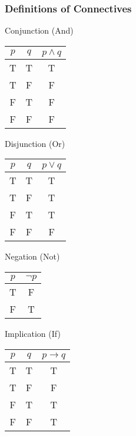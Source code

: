 \documentclass[usenames,dvipsnames]{beamer}
\begin{document}
\begin{frame}[fragile]
  \frametitle{Definitions of Connectives}
  \begin{minipage}{0.32\textwidth}
    Conjunction (And) \\
    \begin{tabular}{| c | c | c |}
    \hline
    $p$ & $q$ & $p \land q$ \\
    \hline
    T & T & T \\
    T & F & F \\
    F & T & F \\
    F & F & F \\
    \hline
    \end{tabular}
  \end{minipage}
  \begin{minipage}{0.32\textwidth}
    Disjunction (Or) \\
    \begin{tabular}{| c | c | c |}
    \hline
    $p$ & $q$ & $p \lor q$ \\
    \hline
    T & T & T \\
    T & F & T \\
    F & T & T \\
    F & F & F \\
    \hline
    \end{tabular}
  \end{minipage}
  \begin{minipage}{0.32\textwidth}
    Negation (Not) \\
    \begin{tabular}{| c | c |}
    \hline
    $p$ & $\lnot p$ \\
    \hline
    T & F \\
    F & T \\
    \hline
    \end{tabular}
  \end{minipage}
  \begin{minipage}{0.32\textwidth}
    $\;$ \\
    Implication (If) \\
    \begin{tabular}{| c | c | c |}
    \hline
    $p$ & $q$ & $p \rightarrow q$ \\
    \hline
    T & T & T \\
    T & F & F \\
    F & T & T \\
    F & F & T \\
    \hline
    \end{tabular}

\end{minipage}
\end{frame}
\end{document}
